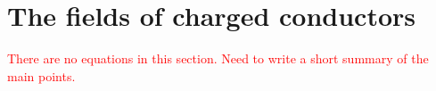 \section{The fields of charged conductors}

\textcolor{red}{There are no equations in this section.
Need to write a short summary of the main points.}

